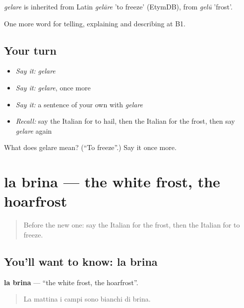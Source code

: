 \begin{cousinweb}
\emph{gelare} is inherited from Latin \emph{gelāre} 'to freeze' (EtymDB), from \emph{gelū} 'frost'.
\end{cousinweb}

\begin{grammarlens}[title={What you've built}]
One more word for telling, explaining and describing at B1.
\end{grammarlens}

\subsection*{Your turn}
\begin{itemize}
\raggedright
  \item \emph{Say it:} \emph{gelare}
  \item \emph{Say it:} \emph{gelare}, once more
  \item \emph{Say it:} a sentence of your own with \emph{gelare}
  \item \emph{Recall:} say the Italian for to hail, then the Italian for the frost, then say \emph{gelare} again
\end{itemize}

\begin{tcolorbox}[breakable,colback=teal!4,colframe=teal!35!black,title={Before you move on}]
What does gelare mean? (\textquotedblleft{}To freeze\textquotedblright{}.) Say it once more.
\end{tcolorbox}
\section[la brina]{la brina — the white frost, the hoarfrost}

\label{lesson:IT-C468-brina}



\begin{quote}
Before the new one: say the Italian for the frost, then the Italian for to freeze.
\end{quote}

\subsection*{You'll want to know: la brina}
\textbf{la brina} — \textquotedblleft{}the white frost, the hoarfrost\textquotedblright{}.

\begin{quote}
La mattina i campi sono bianchi di brina.
\end{quote}


